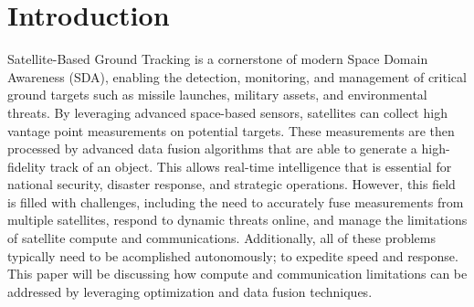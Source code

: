 \section{Introduction}




Satellite-Based Ground Tracking is a cornerstone of modern Space Domain Awareness (SDA), enabling the detection, monitoring, and management of critical ground targets such as missile launches, military assets, and environmental threats. 
By leveraging advanced space-based sensors, satellites can collect high vantage point measurements on potential targets. These measurements are then processed by advanced data fusion algorithms that are able to generate a high-fidelity track of an object.
This allows real-time intelligence that is essential for national security, disaster response, and strategic operations.
However, this field is filled with challenges, including the need to accurately fuse measurements from multiple satellites, respond to dynamic threats online, and manage the limitations of satellite compute and communications.
Additionally, all of these problems typically need to be acomplished autonomously; to expedite speed and response. 
This paper will be discussing how compute and communication limitations can be addressed by leveraging optimization and data fusion techniques.

